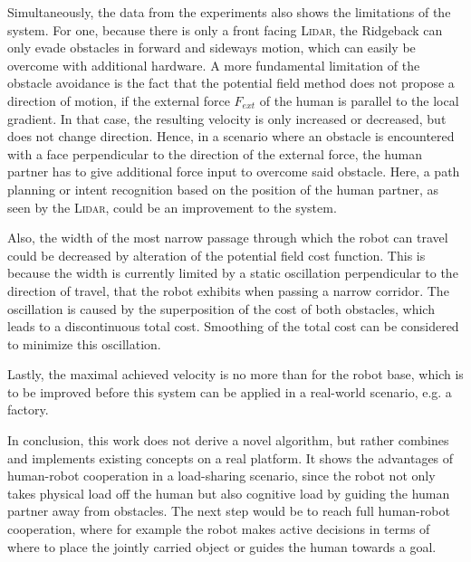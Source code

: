 Simultaneously, the data from the experiments also shows the limitations of the system. For one, because there is only a front facing \textsc{Lidar}, the Ridgeback can only evade obstacles in forward and sideways motion, which can easily be overcome with additional hardware. A more fundamental limitation of the obstacle avoidance is the fact that the potential field method does not propose a direction of motion, if the external force $F_{ext}$ of the human is parallel to the local gradient. In that case, the resulting velocity is only increased or decreased, but does not change direction. Hence, in a scenario where an obstacle is encountered with a face perpendicular to the direction of the external force, the human partner has to give additional force input to overcome said obstacle. Here, a path planning or intent recognition based on the position of the human partner, as seen by the \textsc{Lidar}, could be an improvement to the system.

Also, the width of the most narrow passage through which the robot can travel could be decreased by alteration of the potential field cost function. This is because the width is currently limited by a static oscillation perpendicular to the direction of travel, that the robot exhibits when passing a narrow corridor. The oscillation is caused by the superposition of the cost of both obstacles, which leads to a discontinuous total cost. Smoothing of the total cost can be considered to minimize this oscillation.

Lastly, the maximal achieved velocity is no more than  for the robot base, which is to be improved before this system can be applied in a real-world scenario, e.g. a factory.

In conclusion, this work does not derive a novel algorithm, but rather combines and implements existing concepts on a real platform. It shows the advantages of human-robot cooperation in a load-sharing scenario, since the robot not only takes physical load off the human but also cognitive load by guiding the human partner away from obstacles. The next step would be to reach full human-robot cooperation, where for example the robot makes active decisions in terms of where to place the jointly carried object or guides the human towards a goal.